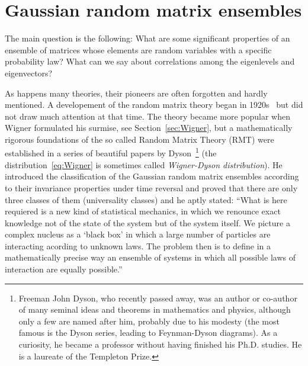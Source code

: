 \documentclass[a4paper,11pt,twoside]{article}
\begin{document}
\section{Gaussian random matrix ensembles}
    The main question is the following: 
    What are some significant properties of an ensemble of matrices whose elements are random variables with a specific probability law? 
    What can we say about correlations among the eigenlevels and eigenvectors?
    
    As happens many theories, their pioneers are often forgotten and hardly mentioned. 
    A developement of the random matrix theory began in 1920s~\cite{Wis28} but did not draw much attention at that time.
    The theory became more popular when Wigner formulated his surmise, see Section~\ref{sec:Wigner},
    but a mathematically rigorous foundations of the so called Random Matrix Theory (RMT) were established in a series of beautiful papers by Dyson~\cite{Dys62}\footnote{
        Freeman John Dyson, who recently passed away, was an author or co-author of many seminal ideas and theorems in mathematics and physics, although only a few are named after him, probably due to his modesty (the most famous is the Dyson series, leading to Feynman-Dyson diagrams). As a curiosity, he became a professor without having finished his Ph.D. studies.
        He is a laureate of the Templeton Prize.
    }
    (the distribution~\ref{eq:Wigner} is sometimes called \emph{Wigner-Dyson distribution}).
    He introduced the classification of the Gaussian random matrix ensembles according to their invariance properties under time reversal and proved that there are only three classes of them (universality classes) and he aptly stated: ``What is here requiered is a new kind of statistical mechanics, in which we renounce exact knowledge not of the state of the system but of the system itself.
    We picture a complex nucleus as a `black box' in which a large number of particles are interacting acording to unknown laws.
    The problem then is to define in a mathematically precise way an ensemble of systems in which all possible laws of interaction are equally possible.''
\end{document}

